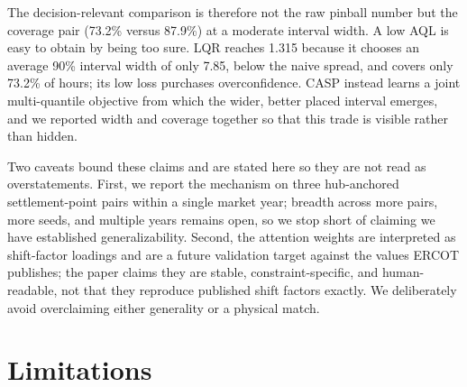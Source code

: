 \documentclass{article}
\begin{document}
The decision-relevant comparison is therefore not the raw pinball number but the coverage pair (73.2\% versus 87.9\%) at a moderate interval width. A low AQL is easy to obtain by being too sure. LQR reaches 1.315 because it chooses an average 90\% interval width of only 7.85, below the naive spread, and covers only 73.2\% of hours; its low loss purchases overconfidence. CASP instead learns a joint multi-quantile objective from which the wider, better placed interval emerges, and we reported width and coverage together so that this trade is visible rather than hidden.

Two caveats bound these claims and are stated here so they are not read as overstatements. First, we report the mechanism on three hub-anchored settlement-point pairs within a single market year; breadth across more pairs, more seeds, and multiple years remains open, so we stop short of claiming we have established generalizability. Second, the attention weights are interpreted as shift-factor loadings and are a future validation target against the values ERCOT publishes; the paper claims they are stable, constraint-specific, and human-readable, not that they reproduce published shift factors exactly. We deliberately avoid overclaiming either generality or a physical match.

\section{Limitations}
\label{sec:limitations}
\end{document}
